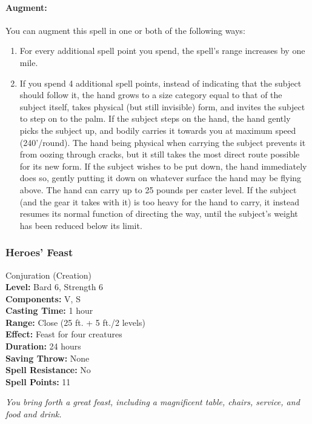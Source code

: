 \paragraph{Augment:} You can augment this spell in one or both of the following ways:
\begin{enumerate}
 \item For every additional spell point you spend, the spell's range increases by one mile.
 \item If you spend 4 additional spell points, instead of indicating that the subject should follow it, the hand grows to a size category equal to that of the subject itself, takes physical (but still invisible) form, and invites the subject to step on to the palm. If the subject steps on the hand, the hand gently picks the subject up, and bodily carries it towards you at maximum speed (240'/round).
 The hand being physical when carrying the subject prevents it from oozing through cracks, but it still takes the most direct route possible for its new form.
 If the subject wishes to be put down, the hand immediately does so, gently putting it down on whatever surface the hand may be flying above.
 The hand can carry up to 25 pounds per caster level. If the subject (and the gear it takes with it) is too heavy for the hand to carry, it instead resumes its normal function of directing the way, until the subject's weight has been reduced below its limit.
\end{enumerate}

\subsubsection{Heroes' Feast}
\label{Spell:HeroesFeast}
Conjuration (Creation)
\\ \textbf{Level:} Bard 6, Strength 6
\\ \textbf{Components:} V, S
\\ \textbf{Casting Time:} 1 hour
\\ \textbf{Range:} Close (25 ft. + 5 ft./2 levels)
\\ \textbf{Effect:} Feast for four creatures
\\ \textbf{Duration:} 24 hours
\\ \textbf{Saving Throw:} None
\\ \textbf{Spell Resistance:} No
\\ \textbf{Spell Points:} 11

\emph{You bring forth a great feast, including a magnificent table, chairs, service, and food and drink.}

